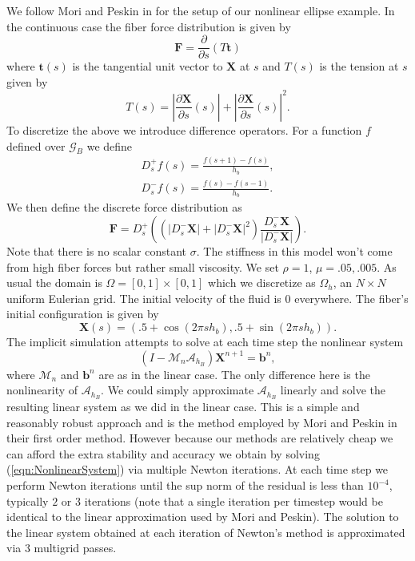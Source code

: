 \documentclass[preprint,12pt]{elsarticle}
\begin{document}
We follow Mori and Peskin in \cite{MoriPeskin} for the setup of our nonlinear ellipse example. In the continuous case the fiber force distribution is given by
\begin{equation}
\mathbf{F} = \frac{\partial}{\partial s} (T\mathbf{t})
\end{equation}
where $\mathbf{t}(s)$ is the tangential unit vector to $\mathbf{X}$ at $s$ and $T(s)$ is the tension at $s$ given by
\begin{equation}
T(s) = \left| \frac{\partial\mathbf{X}}{\partial s}(s) \right|
 +     \left| \frac{\partial\mathbf{X}}{\partial s}(s) \right|^2.
\end{equation}
To discretize the above we introduce difference operators. For a function $f$ defined over $\mathcal{G}_B$ we define
\begin{eqnarray}
D_s^+f(s) = \frac{f(s+1)-f(s)}{h_b},\\
D_s^-f(s) = \frac{f(s)-f(s-1)}{h_b}.
\end{eqnarray}
We then define the discrete force distribution as
\begin{equation}
\mathbf{F} = D_s^+ \left(\left(
\left| D_s^-\mathbf{X} \right| +
\left| D_s^-\mathbf{X} \right|^2 \right)
\frac{ D_s^-\mathbf{X} }{ \left| D_s^-\mathbf{X} \right| } \right).
\end{equation}
Note that there is no scalar constant $\sigma$. The stiffness in this model won't come from high fiber forces but rather small viscosity. We set $\rho = 1$, $\mu = .05,.005$. As usual the domain is $\Omega = [0,1]\times[0,1]$ which we discretize as $\Omega_h$, an $N\times N$ uniform Eulerian grid. The initial velocity of the fluid is $0$ everywhere. The fiber's initial configuration is given by
\begin{equation}
\mathbf{X}(s) = (.5 + \cos(2\pi sh_b), .5 + \sin(2\pi sh_b)).
\end{equation}
The implicit simulation attempts to solve at each time step the nonlinear system
\begin{equation}
(I - \mathcal{M}_n\mathcal{A}_{h_B})\mathbf{X}^{n+1} = \mathbf{b}^n,
\label{eqn:NonlinearSystem}
\end{equation}
where $\mathcal{M}_n$ and $\mathbf{b}^n$ are as in the linear case. The only difference here is the nonlinearity of $\mathcal{A}_{h_B}$. We could simply approximate $\mathcal{A}_{h_B}$ linearly and solve the resulting linear system as we did in the linear case. This is a simple and reasonably robust approach and is the method employed by Mori and Peskin in their first order method. However because our methods are relatively cheap we can afford the extra stability and accuracy we obtain by solving (\ref{eqn:NonlinearSystem}) via multiple Newton iterations. At each time step we perform Newton iterations until the sup norm of the residual is less than $10^{-4}$, typically $2$ or $3$ iterations (note that a single iteration per timestep would be identical to the linear approximation used by Mori and Peskin). The solution to the linear system obtained at each iteration of Newton's method is approximated via $3$ multigrid passes.
\end{document}
